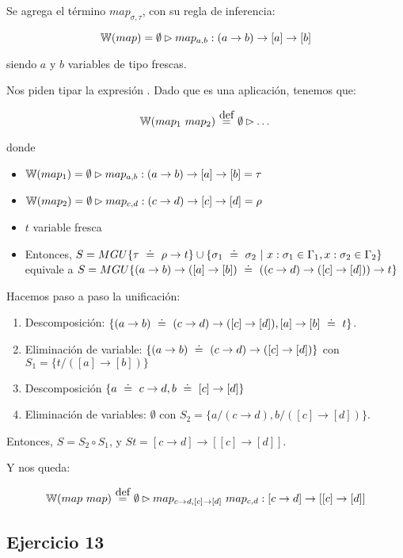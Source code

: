 Se agrega el término $map_{\sigma,\tau}$, con su regla de inferencia:

\[\mathbb{W}(map) = \emptyset \rhd map_{a,b} : (a\to b) \to [a] \to [b]\]

siendo $a$ y $b$ variables de tipo frescas.

Nos piden tipar la expresión . Dado que es una aplicación, tenemos que:

\[\w{\app{map_1}{map_2}} \eqdef \emptyset \rhd \dots \]

donde
\begin{itemize}
  \item $\mathbb{W}(map_1) = \emptyset \rhd map_{a,b} : (a\to b) \to [a] \to [b] = \tau$
  \item $\mathbb{W}(map_2) = \emptyset \rhd map_{c,d} : (c\to d) \to [c] \to [d] = \rho$
  \item $t$ variable fresca
  \item Entonces, $S = MGU\{\tau \uni \rho\to t\} \cup \{\sigma_1 \uni \sigma_2 \vert x:\sigma_1 \in \Gamma_1, x:\sigma_2 \in \Gamma_2\}$ equivale a $S = MGU \{(a\to b) \to ([a] \to [b]) \uni ((c\to d) \to ([c] \to [d])) \to t \}$
\end{itemize}

Hacemos paso a paso la unificación:

\begin{enumerate}
  \item Descomposición: $\{(a\to b) \uni (c\to d) \to ([c] \to [d]),  [a] \to [b] \uni t \}$.
  \item Eliminación de variable: $\{(a\to b) \uni (c\to d) \to ([c] \to [d])\}$ con $S_1 = \{t/([a] \to [b])\}$
  \item Descomposición $\{a \uni c\to d, b \uni [c] \to [d]\}$
  \item Eliminación de variables: $\emptyset$ con $S_2 = \{a/(c\to d), b / ([c] \to [d])\}$.
\end{enumerate}

Entonces, $S = S_2 \circ S_1$, y $St = [c\to d] \to [[c] \to [d]]$.

Y nos queda:

\[\w{\app{map}{map}} \eqdef \emptyset \rhd \app{map_{c\to d, [c] \to [d]}}{map_{c,d}} : [c\to d] \to [[c] \to [d]]\]

\subsection*{Ejercicio 13}

